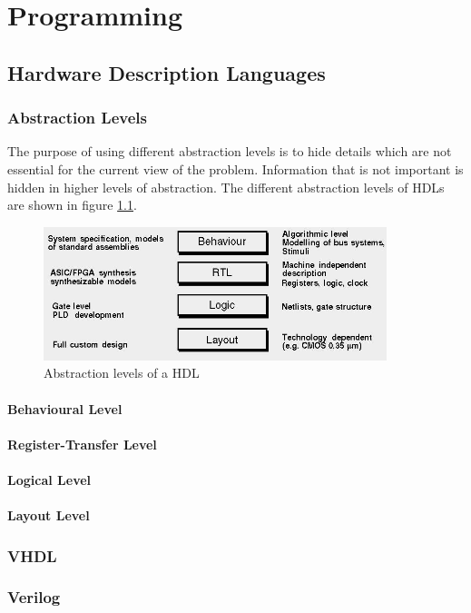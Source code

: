 \chapter{Programming}
\section{Hardware Description Languages}
\subsection{Abstraction Levels}
The purpose of using different abstraction levels is to hide details which are not essential for the current view of the problem. Information that is not important is hidden in higher levels of abstraction. The different abstraction levels of HDLs are shown in figure \ref{fig:hdlabstractionlevels}.
\begin{figure}[htbp]
\begin{center}
\includegraphics[width=10cm,keepaspectratio=true]{bilder/png/hdlabstractionlevels}
\caption{Abstraction levels of a HDL \cite{Ver16}}
\label{fig:hdlabstractionlevels}
\end{center}
\end{figure}
\subsubsection{Behavioural Level}
\subsubsection{Register-Transfer Level}
\subsubsection{Logical Level}
\subsubsection{Layout Level}
\label{kap:HDL}
\subsection{VHDL}
\subsection{Verilog}
